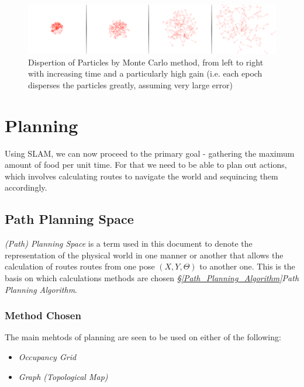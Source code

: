 \documentclass[11pt, a4paper]{article}
\begin{document}
\begin{figure}[p]
  \includegraphics[width=\textwidth]{../assets/particle-disperse-random.png}
  \caption{
    \label{fig:particle-disperse}
    Dispertion of Particles by Monte Carlo method, from left to right with increasing time and 
    a particularly high gain (i.e. each epoch disperses the particles greatly, assuming very large error)
  }
\end{figure}



\newpage
\section{Planning}

Using SLAM, we can now proceed to the primary goal - gathering the maximum amount of food per unit time. For that we need to be able to plan out actions, which involves calculating routes to navigate the world and sequincing them accordingly.

\subsection{Path Planning Space}
\label{Path_Planning_Space}

\textit{(Path) Planning Space} is a term used  in this document to denote the representation of the physical world in one manner or another that allows the calculation of routes routes from one pose $(X,Y, \Theta)$ to another one. This is the basis on which calculations methods are chosen \textit{\S\ref{Path_Planning_Algorithm}Path Planning Algorithm}. 

\subsubsection{Method Chosen}

The main mehtods\cite{path_space} of planning are seen to be used on either of the following:

\begin{itemize}
	\item \textit{Occupancy Grid}
	\item \textit{Graph (Topological Map)}
\end{itemize}
\end{document}
